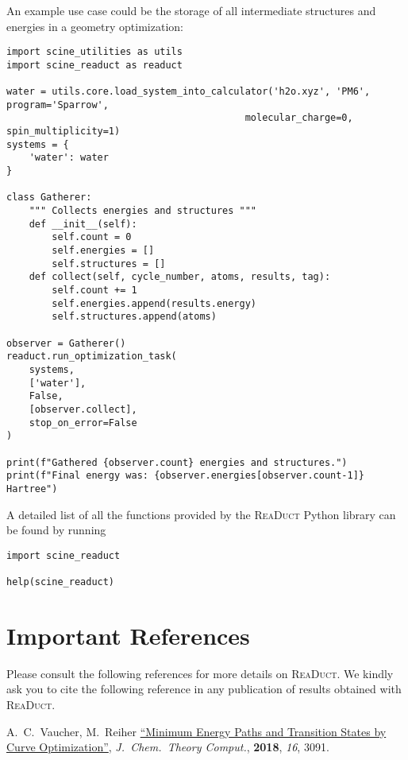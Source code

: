 \documentclass[]{tufte-book}
\begin{document}
An example use case could be the storage of all intermediate structures and energies in a geometry optimization:

\begin{verbatim}
import scine_utilities as utils
import scine_readuct as readuct

water = utils.core.load_system_into_calculator('h2o.xyz', 'PM6', program='Sparrow',
                                          molecular_charge=0, spin_multiplicity=1)
systems = {
    'water': water
}

class Gatherer:
    """ Collects energies and structures """
    def __init__(self):
        self.count = 0
        self.energies = []
        self.structures = []
    def collect(self, cycle_number, atoms, results, tag):
        self.count += 1
        self.energies.append(results.energy)
        self.structures.append(atoms)

observer = Gatherer()
readuct.run_optimization_task(
    systems,
    ['water'],
    False,
    [observer.collect],
    stop_on_error=False
)

print(f"Gathered {observer.count} energies and structures.")
print(f"Final energy was: {observer.energies[observer.count-1]} Hartree")
\end{verbatim}



A detailed list of all the functions provided by the \textsc{ReaDuct} Python library can be found by running
\begin{verbatim}
import scine_readuct

help(scine_readuct)
\end{verbatim}



\chapter{Important References}

Please consult the following references for more details on \textsc{ReaDuct}.
We kindly ask you to cite the following reference in any publication of results obtained with \textsc{ReaDuct}.
\vspace{1.0cm}

A.~C.~Vaucher, M.~Reiher \href{https://pubs.acs.org/doi/10.1021/acs.jctc.8b00169}{``Minimum Energy Paths and Transition States by Curve Optimization''}, \textit{J.~Chem.~Theory Comput.}, \textbf{2018}, \textit{16}, 3091.




\backmatter




\end{document}
